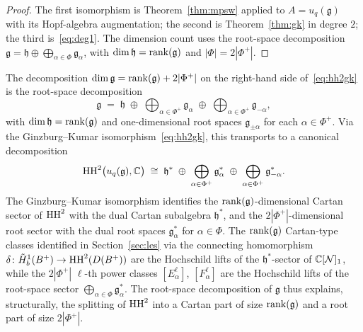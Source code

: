 \begin{proof}
The first isomorphism is Theorem~\ref{thm:mpsw} applied to $A = u_q(\mathfrak{g})$ with its Hopf-algebra augmentation; the second is Theorem~\ref{thm:gk} in degree $2$; the third is~\eqref{eq:deg1}. The dimension count uses the root-space decomposition $\mathfrak{g} = \mathfrak{h} \oplus \bigoplus_{\alpha \in \Phi} \mathfrak{g}_\alpha$, with $\dim \mathfrak{h} = \operatorname{rank}(\mathfrak{g})$ and $|\Phi| = 2|\Phi^+|$.
\end{proof}

\begin{remark}
\label{rem:rootspace}
The decomposition $\dim \mathfrak{g} = \operatorname{rank}(\mathfrak{g}) + 2|\Phi^+|$ on the right-hand side of~\eqref{eq:hh2gk} is the root-space decomposition
\[
\mathfrak{g} \;=\; \mathfrak{h} \;\oplus\; \bigoplus_{\alpha \in \Phi^+} \mathfrak{g}_\alpha \;\oplus\; \bigoplus_{\alpha \in \Phi^+} \mathfrak{g}_{-\alpha},
\]
with $\dim \mathfrak{h} = \operatorname{rank}(\mathfrak{g})$ and one-dimensional root spaces $\mathfrak{g}_{\pm \alpha}$ for each $\alpha \in \Phi^+$. Via the Ginzburg--Kumar isomorphism~\eqref{eq:hh2gk}, this transports to a canonical decomposition
\[
\operatorname{HH}^2\bigl(u_q(\mathfrak{g}), \mathbb{C}\bigr) \;\cong\; \mathfrak{h}^* \;\oplus\; \bigoplus_{\alpha \in \Phi^+} \mathfrak{g}_\alpha^* \;\oplus\; \bigoplus_{\alpha \in \Phi^+} \mathfrak{g}_{-\alpha}^*.
\]
The Ginzburg--Kumar isomorphism identifies the $\operatorname{rank}(\mathfrak{g})$-dimensional Cartan sector of $\operatorname{HH}^2$ with the dual Cartan subalgebra $\mathfrak{h}^*$, and the $2|\Phi^+|$-dimensional root sector with the dual root spaces $\mathfrak{g}_\alpha^*$ for $\alpha \in \Phi$. The $\operatorname{rank}(\mathfrak{g})$ Cartan-type classes identified in Section~\ref{sec:les} via the connecting homomorphism $\delta \colon \tilde{H}^1_b(B^{+}) \to \operatorname{HH}^2(D(B^{+}))$ are the Hochschild lifts of the $\mathfrak{h}^*$-sector of $\mathbb{C}[\mathcal{N}]_1$, while the $2|\Phi^+|$ $\ell$-th power classes $[E_\alpha^\ell]$, $[F_\alpha^\ell]$ are the Hochschild lifts of the root-space sector $\bigoplus_{\alpha \in \Phi} \mathfrak{g}_\alpha^*$. The root-space decomposition of $\mathfrak{g}$ thus explains, structurally, the splitting of $\operatorname{HH}^2$ into a Cartan part of size $\operatorname{rank}(\mathfrak{g})$ and a root part of size $2|\Phi^+|$.
\end{remark}

